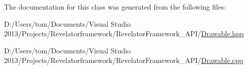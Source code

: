The documentation for this class was generated from the following files\-:\begin{DoxyCompactItemize}
\item 
D\-:/\-Users/tom/\-Documents/\-Visual Studio 2013/\-Projects/\-Revelatorframework/\-Revelator\-Framework\-\_\-\-A\-P\-I/\hyperlink{_drawable_8hpp}{Drawable.\-hpp}\item 
D\-:/\-Users/tom/\-Documents/\-Visual Studio 2013/\-Projects/\-Revelatorframework/\-Revelator\-Framework\-\_\-\-A\-P\-I/\hyperlink{_drawable_8cpp}{Drawable.\-cpp}\end{DoxyCompactItemize}
